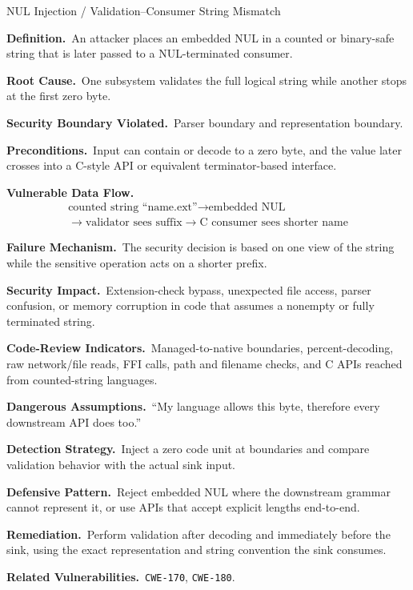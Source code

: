 \documentclass[11pt]{article}
\newcommand{\field}[1]{\par\smallskip\noindent\textbf{#1.}\ }
\newcommand{\cwe}[1]{\texttt{#1}}
\begin{document}
\begin{catalogbox}{NUL Injection / Validation--Consumer String Mismatch}
\field{Definition}An attacker places an embedded NUL in a counted or binary-safe string that is later passed to a NUL-terminated consumer.

\field{Root Cause}One subsystem validates the full logical string while another stops at the first zero byte.

\field{Security Boundary Violated}Parser boundary and representation boundary.

\field{Preconditions}Input can contain or decode to a zero byte, and the value later crosses into a C-style API or equivalent terminator-based interface.

\field{Vulnerable Data Flow}
\[
\begin{gathered}
\text{counted string ``name.ext''} \rightarrow \text{embedded NUL} \\
\rightarrow \text{validator sees suffix} \rightarrow \text{C consumer sees shorter name}
\end{gathered}
\]

\field{Failure Mechanism}The security decision is based on one view of the string while the sensitive operation acts on a shorter prefix.

\field{Security Impact}Extension-check bypass, unexpected file access, parser confusion, or memory corruption in code that assumes a nonempty or fully terminated string.

\field{Code-Review Indicators}Managed-to-native boundaries, percent-decoding, raw network/file reads, FFI calls, path and filename checks, and C APIs reached from counted-string languages.

\field{Dangerous Assumptions}``My language allows this byte, therefore every downstream API does too.''

\field{Detection Strategy}Inject a zero code unit at boundaries and compare validation behavior with the actual sink input.

\field{Defensive Pattern}Reject embedded NUL where the downstream grammar cannot represent it, or use APIs that accept explicit lengths end-to-end.

\field{Remediation}Perform validation after decoding and immediately before the sink, using the exact representation and string convention the sink consumes.

\field{Related Vulnerabilities}\cwe{CWE-170}, \cwe{CWE-180}.
\end{catalogbox}
\end{document}

